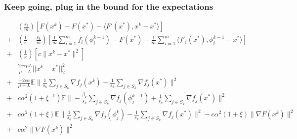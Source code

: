 \documentclass[11pt]{article}
\begin{document}
 
\subsubsection{Keep going, plug in the bound for the expectations}
\begin{align*}
	& \left( \frac{s_k}{m}  \right) \left[   F(x^k) - F(x^*) -  \langle F'(x^*), x^k - x^*\rangle \right] \\
	+& \left( \frac{1}{\kappa} - \frac{s_k}{m}\right) \left[ \frac{1}{m}\sum_{i =1}^{m}  f_i(\phi_i^{k-1})   - F(x^*)  -\frac{1}{m}\sum_{i =1}^{m}   \langle f'_i(x^*), \phi_i^{k-1} - x^*\rangle \right] \\
	+& \left( \frac{1}{\kappa} \right) \left[ c \|x^k - x^* \|^2 \right] \\
	-&\frac{ 2c \alpha \mu L}{\mu+L}||x^k-x^*||_2^2 \\
	+& \frac{ -2c \alpha }{\mu+L}\mathbb{E} \| \frac{1}{s_k} \sum_{j \in S_k}   \nabla f_j(x^k) -\frac{1}{s_k} \sum_{j \in S_k}   \nabla f_j(x^*) \|^2 \\
	+&c \alpha^2 (1+\xi^{-1})\mathbb{E}   \|  - \frac{ \beta_k }{s_k} \sum_{j \in S_k}  \nabla f_j(\phi^{k-1}_j) + \frac{1}{s_k} \sum_{j \in S_k}  \nabla f_j(x^*)\|^2 \\
	+&c \alpha^2 (1+\xi) \mathbb{E} \| \frac{1}{s_k} \sum_{j \in S_k}  \nabla f_j(\phi_j^{k}) - \frac{1 }{s_k} \sum_{j \in S_k}  \nabla f_j(x^*)\|^2  - c \alpha^2(1+\xi) \|  \nabla F (x^k) \|^2   \\
	+&c \alpha^2  \|\nabla F (x^k) \|^2 \\
\end{align*}
\end{document}
